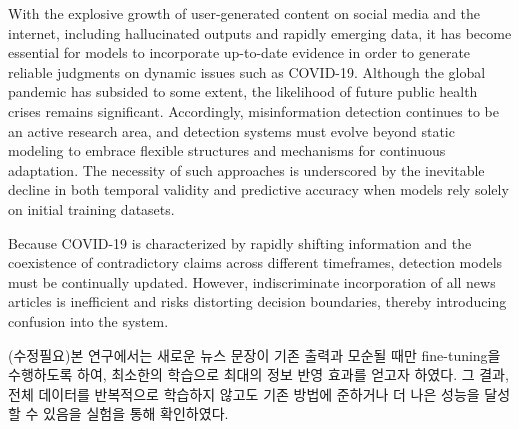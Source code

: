 \documentclass[a4paper,fleqn]{cas-sc}
\begin{document}
With the explosive growth of user-generated content on social media and the internet, including hallucinated outputs and rapidly emerging data, it has become essential for models to incorporate up-to-date evidence in order to generate reliable judgments on dynamic issues such as COVID-19. Although the global pandemic has subsided to some extent, the likelihood of future public health crises remains significant. Accordingly, misinformation detection continues to be an active research area, and detection systems must evolve beyond static modeling to embrace flexible structures and mechanisms for continuous adaptation. The necessity of such approaches is underscored by the inevitable decline in both temporal validity and predictive accuracy when models rely solely on initial training datasets.

Because COVID-19 is characterized by rapidly shifting information and the coexistence of contradictory claims across different timeframes, detection models must be continually updated. However, indiscriminate incorporation of all news articles is inefficient and risks distorting decision boundaries, thereby introducing confusion into the system.

(수정필요)본 연구에서는 새로운 뉴스 문장이 기존 출력과 모순될 때만 fine-tuning을 수행하도록 하여, 최소한의 학습으로 최대의 정보 반영 효과를 얻고자 하였다. 그 결과, 전체 데이터를 반복적으로 학습하지 않고도 기존 방법에 준하거나 더 나은 성능을 달성할 수 있음을 실험을 통해 확인하였다.
\end{document}
